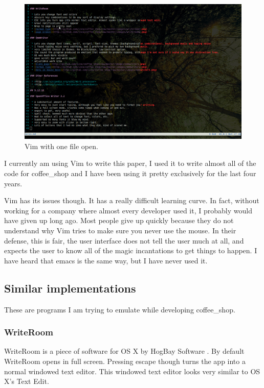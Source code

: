 \documentclass[10pt]{article}
\begin{document}
\begin{figure}
   \centering
      \includegraphics[width=130mm]{images/vim2.png}
   \caption{Vim with one file open.}
\end{figure}

I currently am using Vim to write this paper, I used it to write almost all of the code for coffee\_shop and I have been using it pretty exclusively for the last four years.

Vim has its issues though. It has a really difficult learning curve. In fact, without working for a company where almost every developer used it, I probably would have given up long ago. Most people give up quickly because they do not understand why Vim tries to make sure you never use the mouse. In their defense, this is fair, the user interface does not tell the user much at all, and expects the user to know all of the magic incantations to get things to happen. I have heard that emacs is the same way, but I have never used it.

\subsection{Similar implementations}

These are programs I am trying to emulate while developing coffee\_shop.

\subsubsection{WriteRoom}

WriteRoom is a piece of software for OS X by HogBay Software \cite{writeroom}. By default WriteRoom opens in full screen. Pressing escape though turns the app into a normal windowed text editor. This windowed text editor looks very similar to OS X's Text Edit.
\end{document}
